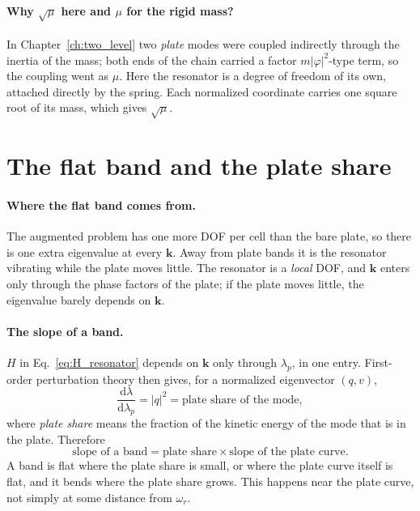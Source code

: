 \paragraph{Why $\sqrt{\mu}$ here and $\mu$ for the rigid mass?}
In Chapter~\ref{ch:two_level} two \emph{plate} modes were coupled indirectly
through the inertia of the mass; both ends of the chain carried a factor
$m|\varphi|^2$-type term, so the coupling went as $\mu$. Here the resonator is
a degree of freedom of its own, attached directly by the spring. Each
normalized coordinate carries one square root of its mass, which gives
$\sqrt{\mu}$.

\section{The flat band and the plate share}

\paragraph{Where the flat band comes from.}
The augmented problem has one more DOF per cell than the bare plate, so there
is one extra eigenvalue at every $\mathbf{k}$. Away from plate bands it is the
resonator vibrating while the plate moves little. The resonator is a
\emph{local} DOF, and $\mathbf{k}$ enters only through the phase factors of
the plate; if the plate moves little, the eigenvalue barely depends on
$\mathbf{k}$.

\paragraph{The slope of a band.}
$H$ in Eq.~\eqref{eq:H_resonator} depends on $\mathbf{k}$ only through
$\lambda_p$, in one entry. First-order perturbation theory then gives, for a
normalized eigenvector $(q, v)$,
\begin{equation}
  \frac{\mathrm{d}\lambda}{\mathrm{d}\lambda_p} = |q|^2 = \text{plate share of the mode},
\end{equation}
where \emph{plate share} means the fraction of the kinetic energy of the mode
that is in the plate. Therefore
\begin{equation}
  \text{slope of a band} = \text{plate share} \times \text{slope of the plate curve} .
\end{equation}
A band is flat where the plate share is small, or where the plate curve itself
is flat, and it bends where the plate share grows. This happens near the plate
curve, not simply at some distance from $\omega_r$.

